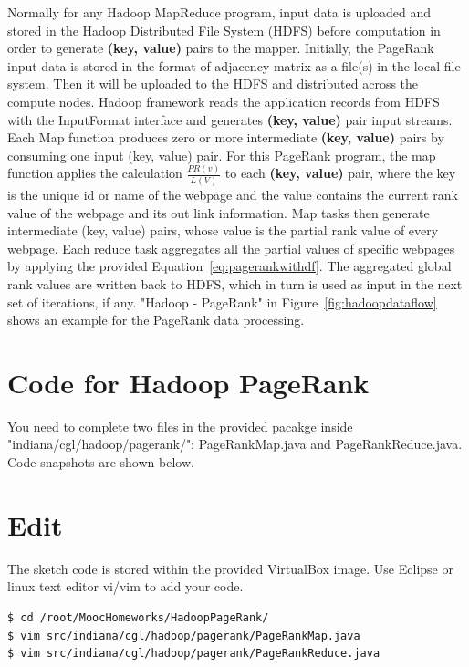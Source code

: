 \documentclass{article}
\begin{document}
Normally for any Hadoop MapReduce program, input data is uploaded and stored in the Hadoop Distributed File System (HDFS) before computation in order to generate \textbf{(key, value)} pairs to the mapper. Initially, the PageRank input data is stored in the format of adjacency matrix as a file(s) in the local file system. Then it will be uploaded to the HDFS and distributed across the compute nodes. Hadoop framework reads the application records from HDFS with the InputFormat interface and generates \textbf{(key, value)} pair input streams. Each Map function produces zero or more intermediate \textbf{(key, value)} pairs by consuming one input (key, value) pair. For this PageRank program, the map function applies the calculation $\frac{PR(v)}{L(V)}$ to each \textbf{(key, value)} pair, where the key is the unique id or name of the webpage and the value contains the current rank value of the webpage and its out link information. Map tasks then generate intermediate (key, value) pairs, whose value is the partial rank value of every webpage. Each reduce task aggregates all the partial values of specific webpages by applying the provided Equation~\ref{eq:pagerankwithdf}. The aggregated global rank values are written back to HDFS, which in turn is used as input in the next set of iterations, if any. "Hadoop - PageRank" in Figure~\ref{fig:hadoopdataflow} shows an example for the PageRank data processing.


\section*{Code for Hadoop PageRank}

You need to complete two files in the provided pacakge inside "indiana/cgl/hadoop/pagerank/": PageRankMap.java and PageRankReduce.java. Code snapshots are shown below.




\section*{Edit}
The sketch code is stored within the provided VirtualBox image. Use Eclipse or linux text editor vi/vim to add your code.
\begin{lstlisting}[language=bash]
$ cd /root/MoocHomeworks/HadoopPageRank/
$ vim src/indiana/cgl/hadoop/pagerank/PageRankMap.java
$ vim src/indiana/cgl/hadoop/pagerank/PageRankReduce.java
\end{lstlisting}
\end{document}
